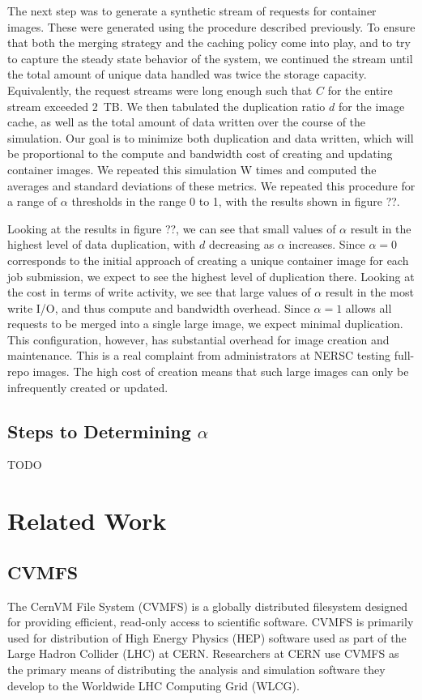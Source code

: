 \documentclass[sigconf]{acmart}
\begin{document}
The next step was to generate a synthetic stream of requests for container images.
These were generated using the procedure described previously.
To ensure that both the merging strategy and the caching policy come into play,
and to try to capture the steady state behavior of the system,
we continued the stream until the total amount of unique data handled was twice the storage capacity.
Equivalently, the request streams were long enough such that $C$ for the entire stream exceeded 2~TB.
We then tabulated the duplication ratio $d$ for the image cache,
as well as the total amount of data written over the course of the simulation.
Our goal is to minimize both duplication and data written,
which will be proportional to the compute and bandwidth cost of creating and updating container images.
We repeated this simulation W times and computed the averages and standard deviations of these metrics.
We repeated this procedure for a range of $\alpha$ thresholds in the range 0 to 1,
with the results shown in figure ??.

Looking at the results in figure ??,
we can see that small values of $\alpha$ result in the highest level of data duplication,
with $d$ decreasing as $\alpha$ increases.
Since $\alpha=0$ corresponds to the initial approach of creating a unique container image for each job submission,
we expect to see the highest level of duplication there.
Looking at the cost in terms of write activity,
we see that large values of $\alpha$ result in the most write I/O,
and thus compute and bandwidth overhead.
Since $\alpha=1$ allows all requests to be merged into a single large image,
we expect minimal duplication.
This configuration, however,
has substantial overhead for image creation and maintenance.
This is a real complaint from administrators at NERSC testing full-repo images.
The high cost of creation means that such large images can only be infrequently created or updated.
\fi

\subsection{Steps to Determining $\alpha$}
TODO

\section{Related Work}

\subsection{CVMFS}
The CernVM File System (CVMFS) is a globally distributed filesystem designed for providing efficient,
read-only access to scientific software.
CVMFS is primarily used for distribution of High Energy Physics (HEP) software used as part of the Large Hadron Collider (LHC) at CERN.
Researchers at CERN use CVMFS as the primary means of distributing the analysis and simulation software they develop to the Worldwide LHC Computing Grid (WLCG).
\end{document}

